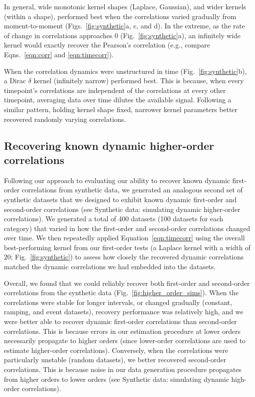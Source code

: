 \documentclass[english]{article}
\begin{document}
In general, wide monotonic kernel shapes (Laplace, Gaussian), and
wider kernels (within a shape), performed best when the correlations
varied gradually from moment-to-moment (Figs.~\ref{fig:synthetic}a, c,
and d).  In the extreme, as the rate of change in correlations
approaches 0 (Fig.~\ref{fig:synthetic}a), an infinitely wide kernel
would exactly recover the Pearson's correlation (e.g., compare
Eqns.~\ref{eqn:corr} and \ref{eqn:timecorr}).

When the correlation dynamics were unstructured in time
(Fig.~\ref{fig:synthetic}b), a Dirac $\delta$ kernel (infinitely
narrow) performed best.  This is because, when every timepoint's
correlations are independent of the correlations at every other
timepoint, averaging data over time dilutes the available signal.
Following a similar pattern, holding kernel shape fixed, narrower
kernel parameters better recovered randomly varying correlations.

\subsection*{Recovering known dynamic higher-order correlations}
Following our approach to evaluating our ability to recover known
dynamic first-order correlations from synthetic data, we generated an
analogous second set of synthetic datasets that we designed to exhibit
known dynamic first-order and second-order correlations (see
Synthetic data: simulating dynamic higher-order
  correlations).  We generated a total of 400 datasets (100 datasets
for each category) that varied in
how the first-order and second-order correlations changed over time.
We then repeatedly applied Equation~\ref{eqn:timecorr} using the
overall best-performing kernel from our first-order tests (a Laplace
kernel with a width of 20; Fig.~\ref{fig:synthetic}) to assess how
closely the recovered dynamic correlations matched the dynamic
correlations we had embedded into the datasets.

Overall, we found that we could reliably recover both first-order and
second-order correlations from the synthetic data
(Fig.~\ref{fig:higher_order_sims}).  When the correlations were stable
for longer intervals, or changed gradually (constant, ramping, and
event datasets), recovery performance was relatively high, and we were
better able to recover dynamic first-order correlations than
second-order correlations.  This is because errors in our estimation
procedure at lower orders necessarily propagate to higher orders
(since lower-order correlations are used to estimate higher-order
correlations).  Conversely, when the correlations were particularly
unstable (random datasets), we better recovered second-order
correlations.  This is because noise in our data generation
procedure propagates from higher orders to lower orders (see
Synthetic data: simulating dynamic high-order correlations).
\end{document}
